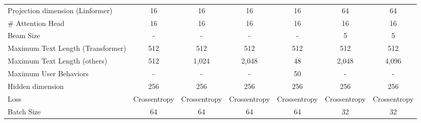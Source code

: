 \documentclass[11pt,a4paper]{article}
\begin{document}
\begin{table*}[h]
{\begin{tabular}{lcccccc}
Projection dimension (Linformer)  & 16           & 16           & 16                                                              & 16                                                                           & 64            & 64           \\
\# Attention Head                 & 16           & 16           & 16                                                              & 16                                                                           & 16            & 16           \\
Beam Size                         & -            & -            & -                                                               & -                                                                            & 5             & 5            \\
Maximum Text Length (Transformer)                        & 512            & 512            & 512                                                               & 512                                                                            & 512             & 512            \\
Maximum Text Length (others)                      & 512            & 1,024            & 2,048                                                               & 48                                                                            & 2,048             & 4,096            \\
Maximum User Behaviors                        & -            & -            & -                                                               & 50                                                                            & -             & -          \\
Hidden dimension                  & 256          & 256          & 256                                                             & 256                                                                          & 256           & 256          \\
Loss                              & Crossentropy & Crossentropy & Crossentropy                                                    & Crossentropy                                                                 & Crossentropy  & Crossentropy \\
Batch Size                        & 64           & 64           & 64                                                              & 64                                                                           & 32            & 32           \\

\end{tabular}}
\end{table*}
\end{document}
